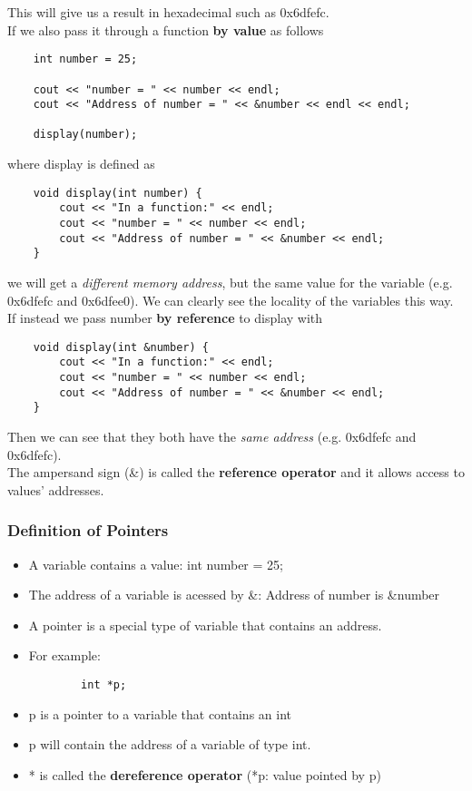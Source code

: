 \documentclass[]{article}
\begin{document}
This will give us a result in hexadecimal such as 0x6dfefc.\\

If we also pass it through a function \textbf{by value} as follows 

\begin{lstlisting}
	int number = 25;
	
	cout << "number = " << number << endl;
	cout << "Address of number = " << &number << endl << endl; 
	
	display(number);
\end{lstlisting}\bigbreak

where display is defined as

\begin{lstlisting}
	void display(int number) {
		cout << "In a function:" << endl;
		cout << "number = " << number << endl;
		cout << "Address of number = " << &number << endl; 
	}
\end{lstlisting}\bigbreak

we will get a \textit{different memory address}, but the same value for the variable (e.g. 0x6dfefc and 0x6dfee0). We can clearly see the locality of the variables this way.\\

If instead we pass number \textbf{by reference} to display with 

\begin{lstlisting}
	void display(int &number) {
		cout << "In a function:" << endl;
		cout << "number = " << number << endl;
		cout << "Address of number = " << &number << endl; 
	}
\end{lstlisting}\bigbreak

Then we can see that they both have the \textit{same address} (e.g. 0x6dfefc and 0x6dfefc).\\

The ampersand sign (\&) is called the \textbf{reference operator} and it allows access to values' addresses.\\


\subsubsection{Definition of Pointers}
\bigbreak

\begin{itemize}
	\item A variable contains a value: int number = 25;
	\item The address of a variable is acessed by \&: Address of number is \&number
	\item A pointer is a special type of variable that contains an address.
	\item For example: \begin{lstlisting}
		int *p;
	\end{lstlisting}
	\item p is a pointer to a variable that contains an int
	\item p will contain the address of a variable of type int.
	\item * is called the \textbf{dereference operator} (*p: value pointed by p) 
\end{itemize}\bigbreak
\end{document}
